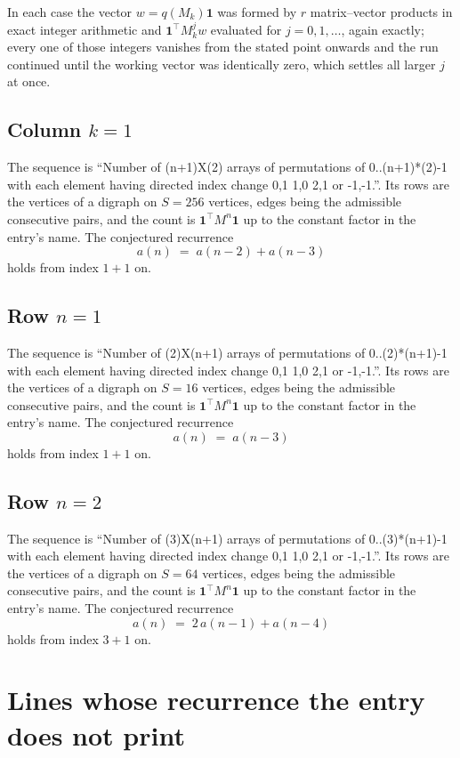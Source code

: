 \documentclass[11pt,a4paper]{article}
\theoremstyle{plain}
\theoremstyle{definition}
\begin{document}
In each case the vector $w=q(M_k)\mathbf{1}$ was formed by $r$ matrix--vector products in
exact integer arithmetic and $\mathbf{1}^{\!\top}M_k^{j}w$ evaluated for $j=0,1,\dots$,
again exactly; every one of those integers vanishes from the stated point onwards and the run
continued until the working vector was identically zero, which settles all larger $j$ at once.

\subsection*{Column $k$$=1$}
The sequence is ``Number of (n+1)X(2) arrays of permutations of 0..(n+1)*(2)-1 with each element having directed index change 0,1 1,0 2,1 or -1,-1.''. Its rows are the vertices of a digraph on
$S=256$ vertices, edges being the admissible consecutive pairs, and the count is
$\mathbf{1}^{\!\top}M^{n}\mathbf{1}$ up to the constant factor in the entry's name.
The conjectured recurrence
\[
a(n)\;=\;a(n-2) + a(n-3)
\]
holds from index $1+1$ on.

\subsection*{Row $n$$=1$}
The sequence is ``Number of (2)X(n+1) arrays of permutations of 0..(2)*(n+1)-1 with each element having directed index change 0,1 1,0 2,1 or -1,-1.''. Its rows are the vertices of a digraph on
$S=16$ vertices, edges being the admissible consecutive pairs, and the count is
$\mathbf{1}^{\!\top}M^{n}\mathbf{1}$ up to the constant factor in the entry's name.
The conjectured recurrence
\[
a(n)\;=\;a(n-3)
\]
holds from index $1+1$ on.

\subsection*{Row $n$$=2$}
The sequence is ``Number of (3)X(n+1) arrays of permutations of 0..(3)*(n+1)-1 with each element having directed index change 0,1 1,0 2,1 or -1,-1.''. Its rows are the vertices of a digraph on
$S=64$ vertices, edges being the admissible consecutive pairs, and the count is
$\mathbf{1}^{\!\top}M^{n}\mathbf{1}$ up to the constant factor in the entry's name.
The conjectured recurrence
\[
a(n)\;=\;2\,a(n-1) + a(n-4)
\]
holds from index $3+1$ on.


\section{Lines whose recurrence the entry does not print}
\end{document}
